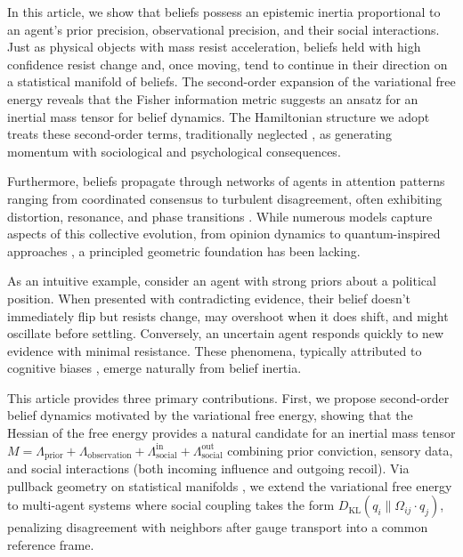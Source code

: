 \documentclass[12pt]{article}
\begin{document}
In this article, we show that beliefs possess an epistemic inertia proportional to an agent's prior precision, observational precision, and their social interactions. Just as physical objects with mass resist acceleration, beliefs held with high confidence resist change and, once moving, tend to continue in their direction on a statistical manifold of beliefs. The second-order expansion of the variational free energy reveals that the Fisher information metric \citep{Amari2016} suggests an ansatz for an inertial mass tensor for belief dynamics. The Hamiltonian structure we adopt treats these second-order terms, traditionally neglected \citep{friston2008hierarchical,bogacz2017tutorial}, as generating momentum with sociological and psychological consequences.

Furthermore, beliefs propagate through networks of agents in attention patterns ranging from coordinated consensus to turbulent disagreement, often exhibiting distortion, resonance, and phase transitions \citep{castellano2009statistical,galam2012sociophysics}. While numerous models capture aspects of this collective evolution, from opinion dynamics \citep{hegselmann2002opinion} to quantum-inspired approaches \citep{busemeyer2012quantum}, a principled geometric foundation has been lacking.

As an intuitive example, consider an agent with strong priors about a political position. When presented with contradicting evidence, their belief doesn't immediately flip but resists change, may overshoot when it does shift, and might oscillate before settling. Conversely, an uncertain agent responds quickly to new evidence with minimal resistance. These phenomena, typically attributed to cognitive biases \citep{kahneman2011thinking}, emerge naturally from belief inertia.

This article provides three primary contributions. First, we propose second-order belief dynamics motivated by the variational free energy, showing that the Hessian of the free energy provides a natural candidate for an inertial mass tensor $M = \Lambda_{\text{prior}} + \Lambda_{\text{observation}} + \Lambda_{\text{social}}^{\text{in}} + \Lambda_{\text{social}}^{\text{out}}$ combining prior conviction, sensory data, and social interactions (both incoming influence and outgoing recoil). Via pullback geometry on statistical manifolds \citep{Amari2016,nielsen2020elementary}, we extend the variational free energy to multi-agent systems where social coupling takes the form $D_{\mathrm{KL}}(q_i \| \Omega_{ij} \cdot q_j)$, penalizing disagreement with neighbors after gauge transport into a common reference frame.
\end{document}
